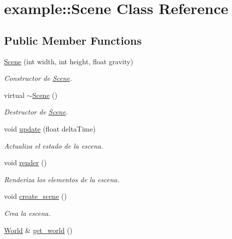 \hypertarget{classexample_1_1_scene}{}\section{example\+::Scene Class Reference}
\label{classexample_1_1_scene}
\subsection*{Public Member Functions}
\begin{DoxyCompactItemize}
\item 
\mbox{\hyperlink{classexample_1_1_scene_a81318928e314f8a3dd6b1e2ab2dbe1f0}{Scene}} (int width, int height, float gravity)
\begin{DoxyCompactList}\small\item\em Constructor de \mbox{\hyperlink{classexample_1_1_scene}{Scene}}. \end{DoxyCompactList}\item 
virtual \mbox{\hyperlink{classexample_1_1_scene_ae1d2e6e5e3d35218f254da4af6384baa}{$\sim$\+Scene}} ()
\begin{DoxyCompactList}\small\item\em Destructor de \mbox{\hyperlink{classexample_1_1_scene}{Scene}}. \end{DoxyCompactList}\item 
void \mbox{\hyperlink{classexample_1_1_scene_a0e90063ee88a217dac88ab964a7dab74}{update}} (float delta\+Time)
\begin{DoxyCompactList}\small\item\em Actualiza el estado de la escena. \end{DoxyCompactList}\item 
void \mbox{\hyperlink{classexample_1_1_scene_a6e8672b9fab7eaa38bc039467dc0b66a}{render}} ()
\begin{DoxyCompactList}\small\item\em Renderiza los elementos de la escena. \end{DoxyCompactList}\item 
void \mbox{\hyperlink{classexample_1_1_scene_ae5a6d62e493fed05e5a3271110148f07}{create\+\_\+scene}} ()
\begin{DoxyCompactList}\small\item\em Crea la escena. \end{DoxyCompactList}\item 
\mbox{\hyperlink{classexample_1_1_world}{World}} \& \mbox{\hyperlink{classexample_1_1_scene_a5cd57b45091b1b472dadd75810e1cc0a}{get\+\_\+world}} ()

\end{DoxyCompactItemize}
